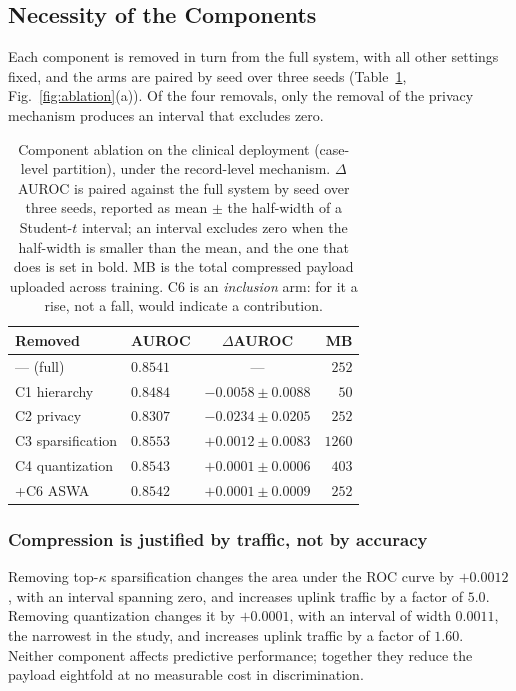 \subsection{Necessity of the Components}
\label{sec:results:ablation}

Each component is removed in turn from the full system, with all other settings
fixed, and the arms are paired by seed over three seeds
(Table~\ref{tab:ablation}, Fig.~\ref{fig:ablation}(a)). Of the four removals, only the removal of the
privacy mechanism produces an interval that excludes zero.

\begin{table}[!t]
\centering
\caption{Component ablation on the clinical deployment (case-level
partition), under the record-level mechanism. $\Delta$AUROC is paired
against the full system by seed over three seeds, reported as mean $\pm$ the
half-width of a Student-$t$ interval; an interval excludes zero when the
half-width is smaller than the mean, and the one that does is set in bold. MB is
the total compressed payload uploaded across training. C6 is an
\emph{inclusion} arm: for it a rise, not a fall, would indicate a contribution.}
\label{tab:ablation}
\small
\setlength{\tabcolsep}{3pt}
\begin{tabular}{llcr}
\toprule
Removed & AUROC & $\Delta$AUROC & MB \\
\midrule
--- (full)        & $0.8541$ & ---                  & $252$ \\
C1 hierarchy      & $0.8484$ & $-0.0058 \pm 0.0088$ & $50$ \\
C2 privacy        & $0.8307$ & $\mathbf{-0.0234 \pm 0.0205}$ & $252$ \\
C3 sparsification & $0.8553$ & $+0.0012 \pm 0.0083$ & $1260$ \\
C4 quantization   & $0.8543$ & $+0.0001 \pm 0.0006$ & $403$ \\
+C6 ASWA          & $0.8542$ & $+0.0001 \pm 0.0009$ & $252$ \\
\bottomrule
\end{tabular}
\end{table}

\subsubsection{Compression is justified by traffic, not by accuracy}
Removing top-$\kappa$ sparsification changes the area under the ROC curve by
$+0.0012$, with an interval spanning zero, and increases uplink traffic by a
factor of $5.0$. Removing quantization changes it by $+0.0001$, with an
interval of width $0.0011$, the narrowest in the study, and increases uplink
traffic by a factor of $1.60$. Neither component affects predictive
performance; together they reduce the payload eightfold at no measurable cost
in discrimination.

